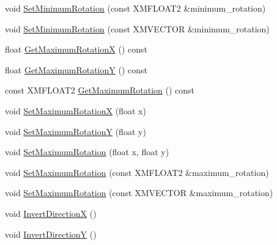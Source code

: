 \begin{DoxyCompactItemize}
\item 
void \hyperlink{classmage_1_1_mouse_look_script_acdc7b208d0636684a7a68bf5bb7ad7a2}{Set\+Minimum\+Rotation} (const X\+M\+F\+L\+O\+A\+T2 \&minimum\+\_\+rotation)
\item 
void \hyperlink{classmage_1_1_mouse_look_script_a2cc85b735807f6d3898efa89c5e689c3}{Set\+Minimum\+Rotation} (const X\+M\+V\+E\+C\+T\+OR \&minimum\+\_\+rotation)
\item 
float \hyperlink{classmage_1_1_mouse_look_script_a07b026b6cb84edfacba8c05dc550da80}{Get\+Maximum\+RotationX} () const
\item 
float \hyperlink{classmage_1_1_mouse_look_script_a9d7ac7941846f4c47d65718faabf6dad}{Get\+Maximum\+RotationY} () const
\item 
const X\+M\+F\+L\+O\+A\+T2 \hyperlink{classmage_1_1_mouse_look_script_a644a7b52eccd338aaa141e8a1016c4e2}{Get\+Maximum\+Rotation} () const
\item 
void \hyperlink{classmage_1_1_mouse_look_script_a080934c7e393603beda98ae0096e3ab7}{Set\+Maximum\+RotationX} (float x)
\item 
void \hyperlink{classmage_1_1_mouse_look_script_ab99d73d8ec44b4e484dffc63bf3f39b1}{Set\+Maximum\+RotationY} (float y)
\item 
void \hyperlink{classmage_1_1_mouse_look_script_a2e9d5982a1d650af143b06ed1d8ccde2}{Set\+Maximum\+Rotation} (float x, float y)
\item 
void \hyperlink{classmage_1_1_mouse_look_script_a551e76e245258b879f229e4e86a91650}{Set\+Maximum\+Rotation} (const X\+M\+F\+L\+O\+A\+T2 \&maximum\+\_\+rotation)
\item 
void \hyperlink{classmage_1_1_mouse_look_script_a1ada4478723b4270dfcb644f4c1b8dc7}{Set\+Maximum\+Rotation} (const X\+M\+V\+E\+C\+T\+OR \&maximum\+\_\+rotation)
\item 
void \hyperlink{classmage_1_1_mouse_look_script_a3e68c097c150cb2f779a7cca1a3c82d5}{Invert\+DirectionX} ()
\item 
void \hyperlink{classmage_1_1_mouse_look_script_a6f0296eceb11425ca02a9fbc19847904}{Invert\+DirectionY} ()
\end{DoxyCompactItemize}
